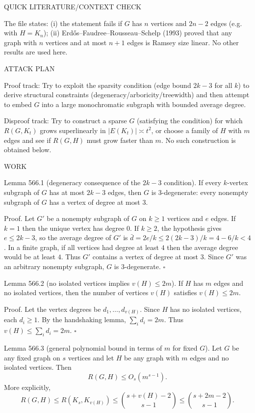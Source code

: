 QUICK LITERATURE/CONTEXT CHECK

The file states:
(i) the statement fails if $G$ has $n$ vertices and $2n-2$ edges (e.g. with $H=K_n$);
(ii) Erd\H{o}s--Faudree--Rousseau--Schelp (1993) proved that any graph with $n$ vertices and at most $n+1$ edges is Ramsey size linear.
No other results are used here.

ATTACK PLAN

Proof track:
Try to exploit the sparsity condition (edge bound $2k-3$ for all $k$) to derive structural constraints (degeneracy/arboricity/treewidth) and then attempt to embed $G$ into a large monochromatic subgraph with bounded average degree.

Disproof track:
Try to construct a sparse $G$ (satisfying the condition) for which $R(G,K_t)$ grows superlinearly in $|E(K_t)|\asymp t^2$, or choose a family of $H$ with $m$ edges and see if $R(G,H)$ must grow faster than $m$.
No such construction is obtained below.

WORK

Lemma 566.1 (degeneracy consequence of the $2k-3$ condition).
If every $k$-vertex subgraph of $G$ has at most $2k-3$ edges, then $G$ is $3$-degenerate: every nonempty subgraph of $G$ has a vertex of degree at most $3$.

Proof.
Let $G'$ be a nonempty subgraph of $G$ on $k\ge 1$ vertices and $e$ edges.
If $k=1$ then the unique vertex has degree $0$.
If $k\ge 2$, the hypothesis gives $e\le 2k-3$, so the average degree of $G'$ is
$\bar d = 2e/k \le 2(2k-3)/k = 4 - 6/k < 4$.
In a finite graph, if all vertices had degree at least $4$ then the average degree would be at least $4$.
Thus $G'$ contains a vertex of degree at most $3$.
Since $G'$ was an arbitrary nonempty subgraph, $G$ is $3$-degenerate. \hfill$\square$

Lemma 566.2 (no isolated vertices implies $v(H)\le 2m$).
If $H$ has $m$ edges and no isolated vertices, then the number of vertices $v(H)$ satisfies $v(H)\le 2m$.

Proof.
Let the vertex degrees be $d_1,\dots,d_{v(H)}$.
Since $H$ has no isolated vertices, each $d_i\ge 1$.
By the handshaking lemma, $\sum_i d_i = 2m$.
Thus $v(H)\le\sum_i d_i = 2m$. \hfill$\square$

Lemma 566.3 (general polynomial bound in terms of $m$ for fixed $G$).
Let $G$ be any fixed graph on $s$ vertices and let $H$ be any graph with $m$ edges and no isolated vertices.
Then
\[
R(G,H) \le O_s(m^{s-1}).
\]
More explicitly,
\[
R(G,H) \le R(K_s, K_{v(H)}) \le \binom{s+v(H)-2}{s-1} \le \binom{s+2m-2}{s-1}.
\]

